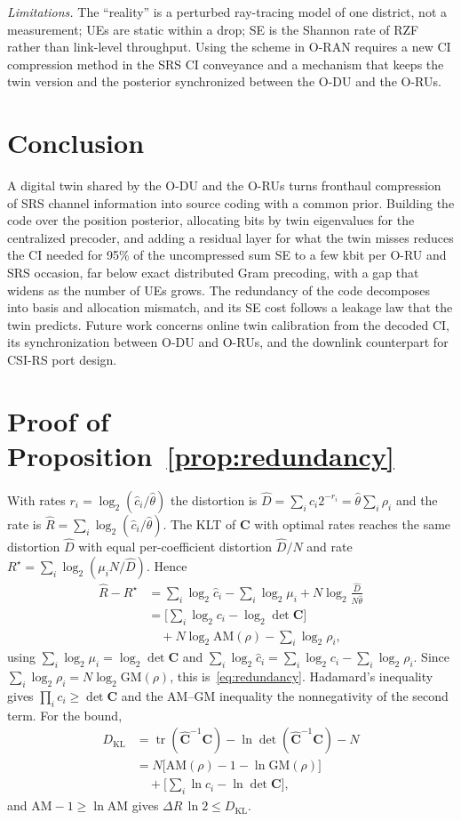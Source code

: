 \documentclass[journal]{IEEEtran}
\newcommand{\vect}[1]{\mathbf{#1}}
\DeclareMathOperator{\tr}{tr}
\begin{document}
\emph{Limitations.} The ``reality'' is a perturbed ray-tracing model of one district, not a measurement; UEs are static within a drop; SE is the Shannon rate of RZF rather than link-level throughput. Using the scheme in O-RAN requires a new CI compression method in the SRS CI conveyance and a mechanism that keeps the twin version and the posterior synchronized between the O-DU and the O-RUs.

\section{Conclusion}
A digital twin shared by the O-DU and the O-RUs turns fronthaul compression of SRS channel information into source coding with a common prior. Building the code over the position posterior, allocating bits by twin eigenvalues for the centralized precoder, and adding a residual layer for what the twin misses reduces the CI needed for 95\% of the uncompressed sum SE to a few kbit per O-RU and SRS occasion, far below exact distributed Gram precoding, with a gap that widens as the number of UEs grows. The redundancy of the code decomposes into basis and allocation mismatch, and its SE cost follows a leakage law that the twin predicts. Future work concerns online twin calibration from the decoded CI, its synchronization between O-DU and O-RUs, and the downlink counterpart for CSI-RS port design.

\appendices
\section{Proof of Proposition~\ref{prop:redundancy}}\label{app:proof}
With rates $r_i=\log_2(\hat c_i/\hat\theta)$ the distortion is $\hat D=\sum_ic_i2^{-r_i}=\hat\theta\sum_i\rho_i$ and the rate is $\hat R=\sum_i\log_2(\hat c_i/\hat\theta)$. The KLT of $\vect{C}$ with optimal rates reaches the same distortion $\hat D$ with equal per-coefficient distortion $\hat D/N$ and rate $R^\star=\sum_i\log_2(\mu_i N/\hat D)$. Hence
\begin{align*}
\hat R-R^\star&=\sum_i\log_2\hat c_i-\sum_i\log_2\mu_i+N\log_2\frac{\hat D}{N\hat\theta}\\
&=\Big[\sum_i\log_2c_i-\log_2\det\vect{C}\Big]\\
&\quad+N\log_2\mathrm{AM}(\rho)-\sum_i\log_2\rho_i,
\end{align*}
using $\sum_i\log_2\mu_i=\log_2\det\vect{C}$ and $\sum_i\log_2\hat c_i=\sum_i\log_2c_i-\sum_i\log_2\rho_i$. Since $\sum_i\log_2\rho_i=N\log_2\mathrm{GM}(\rho)$, this is~\eqref{eq:redundancy}. Hadamard's inequality gives $\prod_ic_i\ge\det\vect{C}$ and the AM--GM inequality the nonnegativity of the second term. For the bound,
\begin{align*}
D_{\mathrm{KL}}&=\tr(\hat{\vect{C}}^{-1}\vect{C})-\ln\det(\hat{\vect{C}}^{-1}\vect{C})-N\\
&=N\big[\mathrm{AM}(\rho)-1-\ln\mathrm{GM}(\rho)\big]\\
&\quad+\Big[\sum_i\ln c_i-\ln\det\vect{C}\Big],
\end{align*}
and $\mathrm{AM}-1\ge\ln\mathrm{AM}$ gives $\Delta R\,\ln2\le D_{\mathrm{KL}}$.



\end{document}
